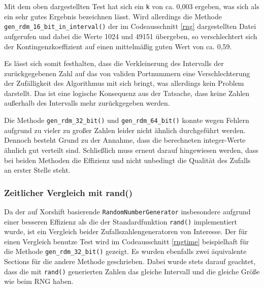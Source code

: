 \documentclass[../review_3.tex]{subfiles}
\begin{document}
Mit dem oben dargestellten Test hat sich ein \texttt{k} von ca. 0,003 ergeben, was sich als ein sehr gutes Ergebnis bezeichnen lässt. Wird allerdings die Methode \texttt{gen\_rdm\_16\_bit\_in\_interval()} der im Codeausschnitt \ref{rng} dargestellten Datei aufgerufen und dabei die Werte 1024 und 49151 übergeben, so verschlechtert sich der Kontingenzkoeffizient auf einen mittelmäßig guten Wert von ca. 0,59.

Es lässt sich somit festhalten, dass die Verkleinerung des Intervalls der zurückgegebenen Zahl auf das von validen Portnummern eine Verschlechterung der Zufälligkeit des Algorithmus mit sich bringt, was allerdings kein Problem darstellt. Das ist eine logische Konsequenz aus der Tatsache, dass keine Zahlen außerhalb des Intervalls mehr zurückgegeben werden.

Die Methode \texttt{gen\_rdm\_32\_bit()} und \texttt{gen\_rdm\_64\_bit()} konnte wegen Fehlern aufgrund zu vieler zu großer Zahlen leider nicht ähnlich durchgeführt werden. Dennoch besteht Grund zu der Annahme, dass die berechneten integer-Werte ähnlich gut verteilt sind. Schließlich muss erneut darauf hingewiesen werden, dass bei beiden Methoden die Effizienz und nicht unbedingt die Qualität des Zufalls an erster Stelle steht.

\subsubsection{Zeitlicher Vergleich mit rand()}
Da der auf Xorshift basierende \texttt{RandomNumberGenerator} insbesondere aufgrund einer besseren Effizienz als die der Standardfunktion \texttt{rand()} implementiert wurde, ist ein Vergleich beider Zufallszahlengeneratoren von Interesse. Der für einen Vergleich benutze Test wird im Codeausschnitt \ref{rngtime} beispielhaft für die Methode \texttt{gen\_rdm\_32\_bit()} gezeigt. Es wurden ebenfalls zwei äquivalente Sections für die andere Methode geschrieben. Dabei wurde stets darauf geachtet, dass die mit \texttt{rand()} generierten Zahlen das gleiche Intervall und die gleiche Größe wie beim RNG haben.
\end{document}
